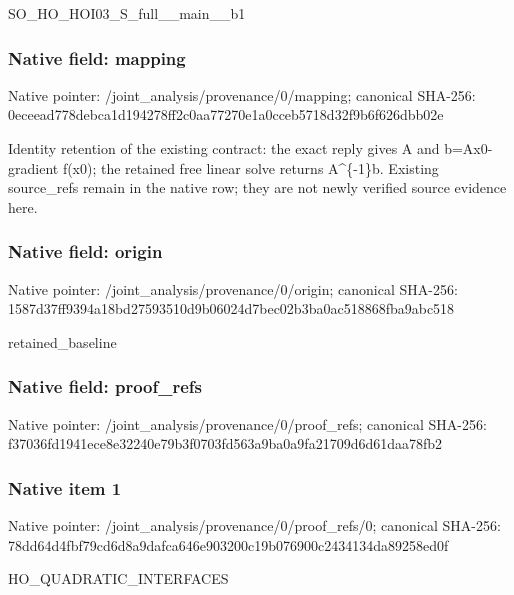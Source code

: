 \documentclass[10pt,a4paper]{article}
\begin{document}
\begingroup\raggedright\sloppy SO\_\allowbreak{}HO\_\allowbreak{}HOI03\_\allowbreak{}S\_\allowbreak{}full\_\allowbreak{}\_\allowbreak{}main\_\allowbreak{}\_\allowbreak{}b1\par\endgroup

\subsubsection{Native field: mapping}
Native pointer: /joint\_\allowbreak{}analysis/provenance/0/mapping; canonical SHA-256: 0eceead778debca1d194278ff2c0aa77270e1a0cceb5718d32f9b6f626dbb02e

\begingroup\raggedright\sloppy Identity retention of the existing contract:\allowbreak{} the exact reply gives A and b=\allowbreak{}Ax0-gradient f(x0);\allowbreak{} the retained free linear solve returns A\textasciicircum{}\{-1\}b. Existing source\_\allowbreak{}refs remain in the native row;\allowbreak{} they are not newly verified source evidence here.\par\endgroup

\subsubsection{Native field: origin}
Native pointer: /joint\_\allowbreak{}analysis/provenance/0/origin; canonical SHA-256: 1587d37ff9394a18bd27593510d9b06024d7bec02b3ba0ac518868fba9abc518

\begingroup\raggedright\sloppy retained\_\allowbreak{}baseline\par\endgroup

\subsubsection{Native field: proof\_\allowbreak{}refs}
Native pointer: /joint\_\allowbreak{}analysis/provenance/0/proof\_\allowbreak{}refs; canonical SHA-256: f37036fd1941ece8e32240e79b3f0703fd563a9ba0a9fa21709d6d61daa78fb2

\subsubsection{Native item 1}
Native pointer: /joint\_\allowbreak{}analysis/provenance/0/proof\_\allowbreak{}refs/0; canonical SHA-256: 78dd64d4fbf79cd6d8a9dafca646e903200c19b076900c2434134da89258ed0f

\begingroup\raggedright\sloppy HO\_\allowbreak{}QUADRATIC\_\allowbreak{}INTERFACES\par\endgroup
\end{document}
